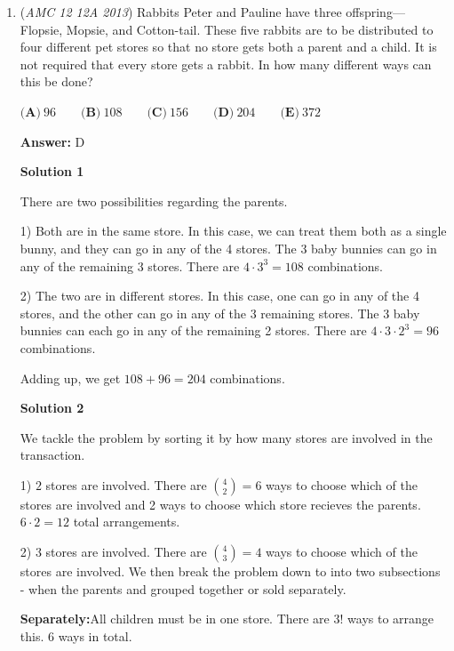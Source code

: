 \begin{enumerate}
 If we factor the two known terms we get $162=2\cdot 3^4$ and $1250=2\cdot 5^4$, thus the quotient is obviously $5/3$ and therefore $x=162\cdot(5/3) = 270$.

 


	\item (\textit{AMC 12 12A 2013}) Rabbits Peter and Pauline have three offspring—Flopsie, Mopsie, and Cotton-tail. These five rabbits are to be distributed to four different pet stores so that no store gets both a parent and a child. It is not required that every store gets a rabbit. In how many different ways can this be done?


 $\textbf{(A)} \ 96 \qquad  \textbf{(B)} \ 108 \qquad  \textbf{(C)} \ 156 \qquad  \textbf{(D)} \ 204 \qquad  \textbf{(E)} \ 372$

 \textbf{Answer: }D



\textbf{Solution 1}

There are two possibilities regarding the parents.

 1) Both are in the same store. In this case, we can treat them both as a single bunny, and they can go in any of the 4 stores. The 3 baby bunnies can go in any of the remaining 3 stores. There are $4 \cdot 3^3 = 108$ combinations.

 
2) The two are in different stores. In this case, one can go in any of the 4 stores, and the other can go in any of the 3 remaining stores. The 3 baby bunnies can each go in any of the remaining 2 stores. There are $4 \cdot 3 \cdot 2^3 = 96$ combinations.

 Adding up, we get $108 + 96 = 204$ combinations.

 



\textbf{Solution 2}

We tackle the problem by sorting it by how many stores are involved in the transaction.

 1) $2$ stores are involved. There are $\binom{4}{2} = 6$ ways to choose which of the stores are involved and 2 ways to choose which store recieves the parents. $6 \cdot 2 = 12$ total arrangements.

 
2) $3$ stores are involved. There are $\binom{4}{3} = 4$ ways to choose which of the stores are involved. We then break the problem down to into two subsections - when the parents and grouped together or sold separately.

 
\textbf{Separately:}All children must be in one store. There are $3!$ ways to arrange this. $6$ ways in total.


\end{enumerate}
